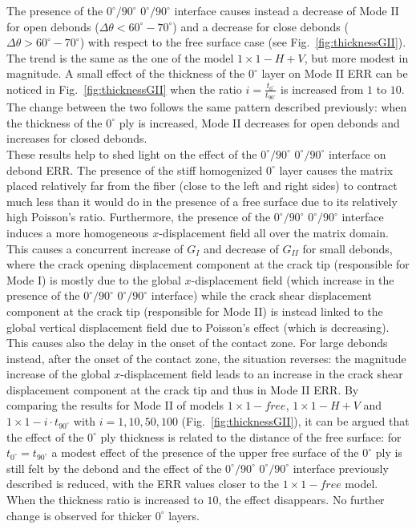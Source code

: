 \documentclass[review]{elsarticle}
\begin{document}
The presence of the $0^{\circ}/90^{\circ}$ $0^{\circ}/90^{\circ}$ interface causes instead a decrease of Mode II for open debonds ($\Delta\theta<60^{\circ}-70^{\circ}$) and a decrease for close debonds ($\Delta\theta>60^{\circ}-70^{\circ}$) with respect to the free surface case (see Fig.~\ref{fig:thicknessGII}). The trend is the same as the one of the model $1\times 1-H+V$, but more modest in magnitude. A small effect of the thickness of the $0^{\circ}$ layer on Mode II ERR can be noticed in Fig.~\ref{fig:thicknessGII} when the ratio $i=\frac{t_{0^{\circ}}}{t_{90^{\circ}}}$ is increased from $1$ to $10$. The change between the two follows the same pattern described previously: when the thickness of the $0^{\circ}$ ply is increased, Mode II decreases for open debonds and increases for closed debonds.\\
These results help to shed light on the effect of the $0^{\circ}/90^{\circ}$ $0^{\circ}/90^{\circ}$ interface on debond ERR. The presence of the stiff homogenized $0^{\circ}$ layer causes the matrix placed relatively far from the fiber (close to the left and right sides) to contract much less than it would do in the presence of a free surface due to its relatively high Poisson's ratio. Furthermore, the presence of the $0^{\circ}/90^{\circ}$ $0^{\circ}/90^{\circ}$ interface induces a more homogeneous $x$-displacement field all over the matrix domain. This causes a concurrent increase of $G_{I}$ and decrease of $G_{II}$ for small debonds, where the crack opening displacement component at the crack tip (responsible for Mode I) is mostly due to the global $x$-displacement field (which increase in the presence of the $0^{\circ}/90^{\circ}$ $0^{\circ}/90^{\circ}$ interface) while the crack shear displacement component at the crack tip (responsible for Mode II) is instead linked to the global vertical displacement field due to Poisson's effect (which is decreasing). This causes also the delay in the onset of the contact zone. For large debonds instead, after the onset of the contact zone, the situation reverses: the magnitude increase of the global $x$-displacement field leads to an increase in the crack shear displacement component at the crack tip and thus in Mode II ERR. By comparing the results for Mode II of models $1\times 1-free$, $1\times 1-H+V$ and $1\times 1-i\cdot t_{90^{\circ}}$ with $i=1,10,50,100$ (Fig.~\ref{fig:thicknessGII}), it can be argued that the effect of the $0^{\circ}$ ply thickness is related to the distance of the free surface: for $t_{0^{\circ}}=t_{90^{\circ}}$ a modest effect of the presence of the upper free surface of the $0^{\circ}$ ply is still felt by the debond and the effect of the $0^{\circ}/90^{\circ}$ $0^{\circ}/90^{\circ}$ interface previously described is reduced, with the ERR values closer to the $1\times 1-free$ model. When the thickness ratio is increased to $10$, the effect disappears. No further change is observed for thicker $0^{\circ}$ layers.
\end{document}
